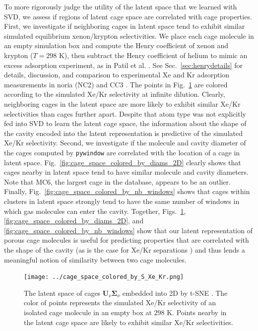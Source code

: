 \documentclass[journal=jacsat,manuscript=article,layout=traditional]{achemso}
\begin{document}
To more rigorously judge the utility of the latent space that we learned with SVD, we assess if regions of latent cage space are correlated with cage properties.
First, we investigate if neighboring cages in latent space tend to exhibit similar simulated equilibrium xenon/krypton selectivities.
We place each cage molecule in an empty simulation box and compute the Henry coefficient of xenon and krypton ($T=298$ K), then subtract the Henry coefficient of helium to mimic an excess adsorption experiment, as in Patil et al. \cite{patil2016noria}. See Sec.~\ref{sec:henrydetails} for details, discussion, and comparison to experimental Xe and Kr adsorption measurements in noria (NC2) \cite{patil2016noria} and CC3 \cite{chen2014separation}.
The points in Fig.~\ref{fig:latent_space_S_Xe_Kr} are colored according to the simulated Xe/Kr selectivity at infinite dilution. Clearly, neighboring cages in the latent space are more likely to exhibit similar Xe/Kr selectivities than cages further apart. Despite that atom type was not explicitly fed into SVD to learn the latent cage space, the information about the shape of the cavity encoded into the latent representation is predictive of the simulated Xe/Kr selectivity. 
Second, we investigate if the molecule and cavity diameter of the cages computed by \texttt{pywindow} \cite{miklitz2018pywindow} are correlated with the location of a cage in latent space. Fig.~\ref{fig:cage_space_colored_by_diams_2D} clearly shows that cages nearby in latent space tend to have similar molecule and cavity diameters. Note that MC6, the largest cage in the database, appears to be an outlier. Finally, Fig.~\ref{fig:cage_space_colored_by_nb_windows} shows that cages within clusters in latent space strongly tend to have the same number of windows in which gas molecules can enter the cavity.
Together, Figs.~\ref{fig:latent_space_S_Xe_Kr}, \ref{fig:cage_space_colored_by_diams_2D}, and \ref{fig:cage_space_colored_by_nb_windows} show that our latent representation of porous cage molecules is useful for predicting properties that are correlated with the shape of the cavity (as is the case for Xe/Kr separations \cite{sikora2012thermodynamic,simon2015best}) and thus lends a meaningful notion of similarity between two cage molecules.

\begin{figure}
\centering
	\texttt{[image: ../cage\_space\_colored\_by\_S\_Xe\_Kr.png]}
	\caption{The latent space of cages $\mathbf{U}_\nu \mathbf{\Sigma}_\nu$ embedded into 2D by t-SNE \cite{maaten2008visualizing,wattenberg2016how}. The color of points represents the simulated Xe/Kr selectivity of an isolated cage molecule in an empty box at 298 K. Points nearby in the latent cage space are likely to exhibit similar Xe/Kr selectivities.
	} \label{fig:latent_space_S_Xe_Kr}
\end{figure}
\end{document}
